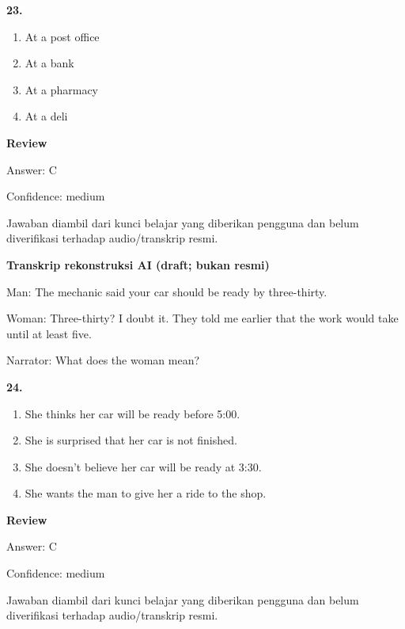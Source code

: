 \documentclass[12pt]{article}
\begin{document}
\noindent\textbf{23.}
\begin{enumerate}[label=(\Alph*),leftmargin=*,itemsep=0.2em]
\item At a post office
\item At a bank
\item At a pharmacy
\item At a deli
\end{enumerate}
\par
\begingroup
\setlength{\parskip}{0pt}
\setlength{\parindent}{0pt}
\textbf{Review}\par
Answer: C\par
Confidence: medium\par
Jawaban diambil dari kunci belajar yang diberikan pengguna dan belum diverifikasi terhadap audio/transkrip resmi.\par
\endgroup
\par
\vspace{0.25\baselineskip}
\begin{exampleblock}
\textbf{Transkrip rekonstruksi AI (draft; bukan resmi)}\par
Man: The mechanic said your car should be ready by three-thirty.\par
Woman: Three-thirty? I doubt it. They told me earlier that the work would take until at least five.\par
Narrator: What does the woman mean?\par
\end{exampleblock}
\noindent\textbf{24.}
\begin{enumerate}[label=(\Alph*),leftmargin=*,itemsep=0.2em]
\item She thinks her car will be ready before 5:00.
\item She is surprised that her car is not finished.
\item She doesn't believe her car will be ready at 3:30.
\item She wants the man to give her a ride to the shop.
\end{enumerate}
\par
\begingroup
\setlength{\parskip}{0pt}
\setlength{\parindent}{0pt}
\textbf{Review}\par
Answer: C\par
Confidence: medium\par
Jawaban diambil dari kunci belajar yang diberikan pengguna dan belum diverifikasi terhadap audio/transkrip resmi.\par
\endgroup
\par
\vspace{0.25\baselineskip}
\end{document}
